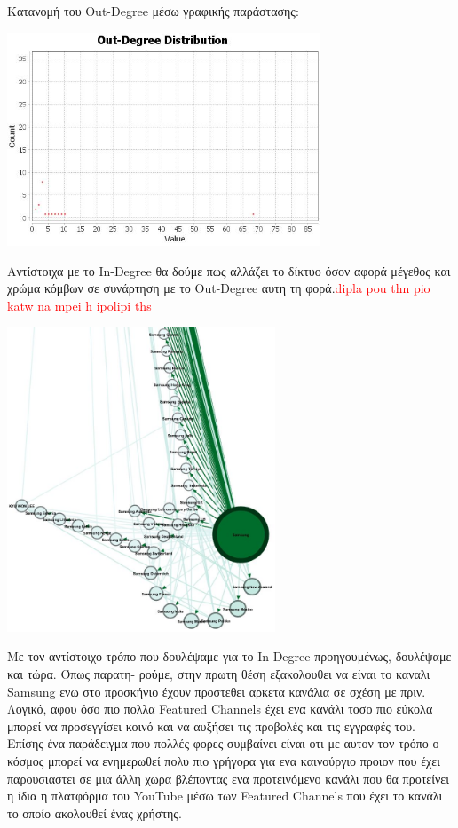 \documentclass[12pt]{article}
\begin{document}
	\newpage
	Κατανομή του Out-Degree μέσω γραφικής παράστασης:
	\begin{center}
		\includegraphics[width=0.7\textwidth]{photos-files/section6/out-degree_graphical.JPG}
	\end{center}
	Αντίστοιχα με το In-Degree θα δούμε πως αλλάζει το δίκτυο όσον αφορά μέγεθος και χρώμα κόμβων σε συνάρτηση με το Out-Degree αυτη τη φορά.\textcolor{red}{dipla pou thn pio katw na mpei h ipolipi ths}
	\begin{center}
		\includegraphics[width=0.6\textwidth]{photos-files/section6/out-degree_RE-layout.JPG}
	\end{center}
	Με τον αντίστοιχο τρόπο που δουλέψαμε για το In-Degree προηγουμένως, δουλέψαμε και τώρα. Όπως παρατη- ρούμε, στην πρωτη θέση εξακολουθει να είναι το καναλι Samsung ενω στο προσκήνιο έχουν προστεθει αρκετα κανάλια σε σχέση με πριν. Λογικό, αφου όσο πιο πολλα Featured Channels έχει ενα κανάλι τοσο πιο εύκολα μπορεί να προσεγγίσει κοινό και να αυξήσει τις προβολές και τις εγγραφές του. Επίσης ένα παράδειγμα που πολλές φορες συμβαίνει είναι οτι με αυτον τον τρόπο ο κόσμος μπορεί να ενημερωθεί πολυ πιο γρήγορα για ενα καινούργιο προιον που έχει παρουσιαστει σε μια άλλη χωρα βλέποντας ενα προτεινόμενο κανάλι που θα προτείνει η ίδια η πλατφόρμα του YouTube μέσω των Featured Channels που έχει το κανάλι το οποίο ακολουθεί ένας χρήστης.
	
\end{document}

